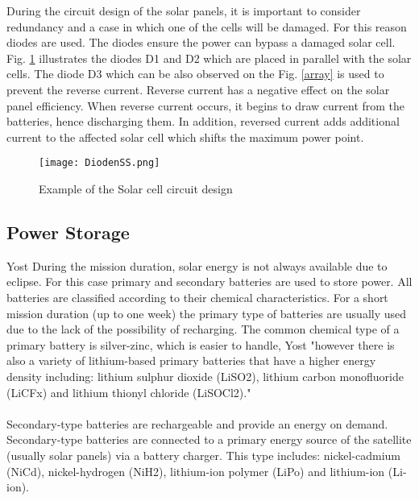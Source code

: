 During the circuit design of the solar panels, it is important to consider redundancy and a case in which one of the cells will be damaged. For this reason diodes are used. The diodes ensure the power can bypass a damaged solar cell. Fig. \ref{dioden} illustrates the diodes D1 and D2 which are placed in parallel with the solar cells. The diode D3 which can be also observed on the Fig. \ref{array} is used to prevent the reverse current. Reverse current has a negative effect on the solar panel efficiency. When reverse current occurs, it begins to draw current from the batteries, hence discharging them. In addition, reversed current adds additional current to the affected solar cell which shifts the maximum power point.\\


\begin{figure}[h]
	\centering
	\texttt{[image: DiodenSS.png]}
	\caption{ Example of the Solar cell circuit design}
	\label{dioden}
\end{figure}
 
\newpage


\subsection{Power Storage \label{sec:tech1}}



Yost\cite{1} During the mission duration, solar energy is not always available due to eclipse. For this case primary and secondary batteries are used to store power. All batteries are classified according to their chemical characteristics. For a short mission duration (up to one week)  the primary type of batteries are usually used due to the lack of the possibility of recharging. The common chemical type of a primary battery is silver-zinc, which is easier to handle, Yost\cite{1} "however there is also a variety of lithium-based primary batteries that have a higher energy density including: lithium sulphur dioxide (LiSO2), lithium carbon monofluoride (LiCFx) and lithium thionyl chloride (LiSOCl2)."\\
\\
Secondary-type batteries are rechargeable and provide an energy on demand. Secondary-type batteries are connected to a primary energy source of the satellite (usually solar panels) via a battery charger. This type includes: nickel-cadmium (NiCd), nickel-hydrogen (NiH2), lithium-ion polymer (LiPo) and lithium-ion (Li-ion).

